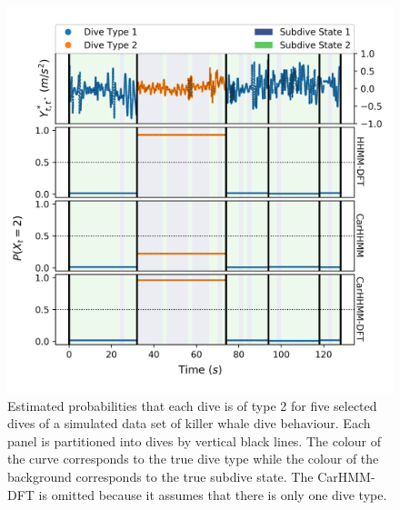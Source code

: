 \begin{figure}[ht]
    \centering
    \includegraphics[width=4.5in]{../Plots/Posterior_Coarse_States.png}
    \caption{Estimated probabilities that each dive is of type 2 for five selected dives of a simulated data set of killer whale dive behaviour. Each panel is partitioned into dives by vertical black lines. The colour of the curve corresponds to the true dive type while the colour of the background corresponds to the true subdive state. The CarHMM-DFT is omitted because it assumes that there is only one dive type.}
    \label{fig:acc_coarse}
\end{figure}

